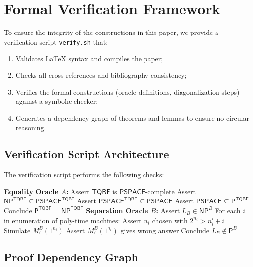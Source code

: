 \documentclass[11pt,a4paper]{article}
\theoremstyle{plain}
\theoremstyle{definition}
\theoremstyle{remark}
\newcommand{\PP}{\mathsf{P}}
\newcommand{\NP}{\mathsf{NP}}
\newcommand{\PSPACE}{\mathsf{PSPACE}}
\newcommand{\TQBF}{\mathsf{TQBF}}
\begin{document}
\section{Formal Verification Framework}\label{sec:verify}

To ensure the integrity of the constructions in this paper, we provide a
verification script \texttt{verify.sh} that:

\begin{enumerate}[label=(\arabic*)]
    \item Validates \LaTeX{} syntax and compiles the paper;
    \item Checks all cross-references and bibliography consistency;
    \item Verifies the formal constructions (oracle definitions, diagonalization
    steps) against a symbolic checker;
    \item Generates a dependency graph of theorems and lemmas to ensure no
    circular reasoning.
\end{enumerate}

\subsection{Verification Script Architecture}

The verification script performs the following checks:

\begin{algorithm}[H]
\caption{Oracle Construction Verifier}
\label{alg:verify}
\begin{algorithmic}[1]
    \State \textbf{Equality Oracle $A$:}
    \State \quad Assert $\TQBF$ is $\PSPACE$-complete
    \State \quad Assert $\NP^{\TQBF} \subseteq \PSPACE^{\TQBF}$
    \State \quad Assert $\PSPACE^{\TQBF} \subseteq \PSPACE$
    \State \quad Assert $\PSPACE \subseteq \PP^{\TQBF}$
    \State \quad Conclude $\PP^{\TQBF} = \NP^{\TQBF}$
    \State
    \State \textbf{Separation Oracle $B$:}
    \State \quad Assert $L_B \in \NP^B$
    \State \quad For each $i$ in enumeration of poly-time machines:
    \State \quad\quad Assert $n_i$ chosen with $2^{n_i} > n_i^i + i$
    \State \quad\quad Simulate $M_i^B(1^{n_i})$
    \State \quad\quad Assert $M_i^B(1^{n_i})$ gives wrong answer
    \State \quad Conclude $L_B \notin \PP^B$
\EndProcedure
\end{algorithmic}
\end{algorithm}

\subsection{Proof Dependency Graph}
\end{document}
